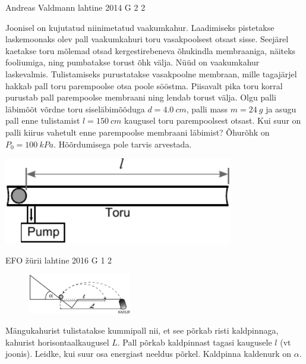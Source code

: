 \documentclass[11pt]{article}
\begin{document}
{%
{Andreas Valdmann} %
{lahtine} %
{2014} %
{G 2} %
{2} %
{
\ifStatement
Joonisel on kujutatud niinimetatud vaakumkahur. Laadimiseks pistetakse laskemoonaks olev pall vaakumkahuri toru vasakpoolsest otsast sisse. Seejärel kaetakse toru mõlemad otsad kergestirebeneva õhukindla membraaniga, näiteks fooliumiga, ning pumbatakse torust õhk välja. Nüüd on vaakumkahur laskevalmis. Tulistamiseks purustatakse vasakpoolne membraan, mille tagajärjel hakkab pall toru parempoolse otsa poole sööstma. Piisavalt pika toru korral purustab pall parempoolse membraani ning lendab torust välja. Olgu palli läbimõõt võrdne toru siseläbimõõduga $d=\SI{4,0}{cm}$, palli mass $m=\SI{24}{g}$ ja asugu pall enne tulistamist $l=\SI{150}{cm}$ kaugusel toru parempoolsest otsast. Kui suur on palli kiirus vahetult enne parempoolse membraani läbimist? Õhurõhk on $P_0=\SI{100}{kPa}$. Hõõrdumisega pole tarvis arvestada.
\begin{center}
 \includegraphics[width=0.75\textwidth]{2014-lahg-02-vaakumkahur.pdf}
\end{center}
\fi
}

{EFO žürii} %
{lahtine} %
{2016} %
{G 1} %
{2} %
{
\ifStatement
\begin{figure}
 \vspace{-20pt}
 \begin{center}
 \includegraphics[width=0.4\textwidth]{2016-lahg-01-kaldjoonis}
 \end{center}
 \vspace{-30pt}
\end{figure}

Mängukahurist tulistatakse kummipall nii, et see põrkab risti kaldpinnaga, kahurist horisontaalkaugusel $L$. Pall põrkab kaldpinnast tagasi kaugusele $l$ (vt joonis). Leidke, kui suur osa energiast neeldus põrkel. Kaldpinna kaldenurk on $\alpha$.
\fi
}

}
\end{document}
